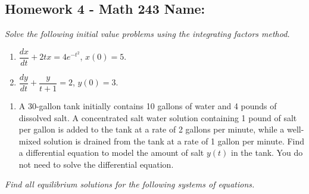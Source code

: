 \documentclass[10pt]{article}
\begin{document}
\pagestyle{empty}
\subsection*{Homework 4 - Math 243 \hfill Name: \underline{\hspace*{2in}}}


\noindent
%
%
%
%


\noindent
\textit{Solve the following initial value problems using the integrating factors method.}

\begin{multicols}{2}
\begin{enumerate}
\setcounter{enumi}{\theenumCount}
\item $\dfrac{dx}{dt} + 2tx = 4 e^{-t^2}$, $x(0) = 5$.


\item $\dfrac{dy}{dt} + \dfrac{y}{t+1} = 2$, $y(0) = 3$.

\setcounter{enumCount}{\theenumi}
\end{enumerate} 
\end{multicols}
\vfill




\begin{enumerate}
\setcounter{enumi}{\theenumCount}
\item A 30-gallon tank initially contains 10 gallons of water and 4 pounds of dissolved salt.  A concentrated salt water solution containing 1 pound of salt per gallon is added to the tank at a rate of 2 gallons per minute, while a well-mixed solution is drained from the tank at a rate of 1 gallon per minute.  Find a differential equation to model the amount of salt $y(t)$ in the tank.  You do not need to solve the differential equation.
\vfill

\setcounter{enumCount}{\theenumi}
\end{enumerate}

\textit{Find all equilibrium solutions for the following systems of equations.}
\end{document}
